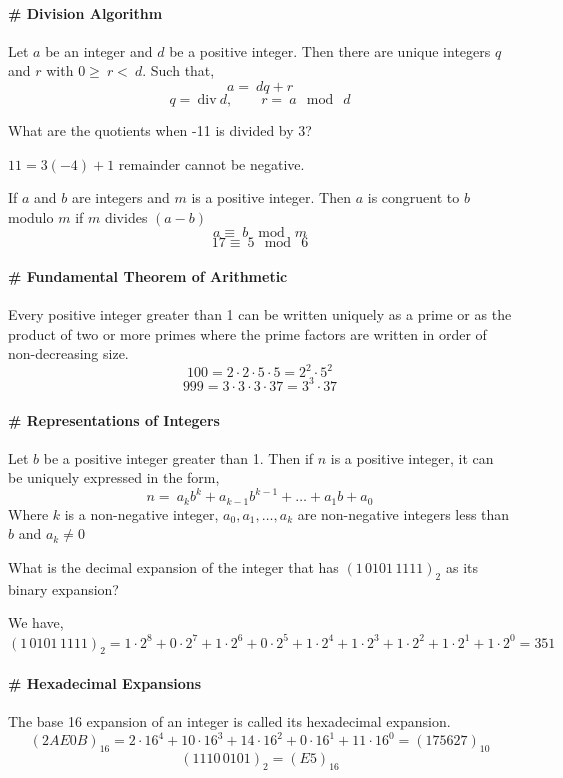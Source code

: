 \documentclass[../main-sheet.tex]{subfiles}
\begin{document}
\paragraph{\# Division Algorithm} Let $ a $ be an integer and $ d $ be a positive integer.
Then there are unique integers $ q $ and $ r $ with \(0\geq\ r <\ d\).
Such that,
\[a=\ dq+r\]
\[q=\ \text{div}\ d,\qquad r=\ a \mod \ d\]
\begin{prob}
    What are the quotients when -11 is divided by 3?
\end{prob}
\begin{soln}
    \(11=3(-4)+1\) remainder cannot be negative.
\end{soln}
If $ a $ and $ b $ are integers and $ m $ is a positive integer.
Then $ a $ is congruent to $ b $ modulo $ m $ if $ m $ divides $ (a-b) $
\[a\equiv\ b \mod\ m\]\[17\equiv\ 5 \mod\ 6\]
\paragraph{\# Fundamental Theorem of Arithmetic} Every positive integer greater than 1 can be written uniquely as a prime or as the product of two or more primes where the prime factors are written in order of non-decreasing size.
\[
    100=2\cdot2\cdot5\cdot5=2^2\cdot5^2
\]
\[
    999=3\cdot3\cdot3\cdot37=3^3 \cdot37
\]

\paragraph{\# Representations of Integers} Let $ b $ be a positive integer greater than 1. Then if $ n $ is a positive integer, it can be uniquely expressed in the form,
\[n=\ a_k b^k+a_{k-1} b^{k-1}+\dots +a_1 b+a_0\]
Where $ k $ is a non-negative integer, \(a_0,a_1,\dots,a_k\) are non-negative integers less than $ b $ and \(a_k\neq0\)
\begin{prob}
    What is the decimal expansion of the integer that has \((1\,0101\,1111)_2\) as its binary expansion?
\end{prob}
\begin{soln}
    We have,
    \[(1\,0101\,1111)_2=1\cdot 2^8+0\cdot2^7+1\cdot2^6+0\cdot2^5+1\cdot2^4+1\cdot2^3+1\cdot2^2+1\cdot2^1+1\cdot2^0=351\]
\end{soln}
\paragraph{\# Hexadecimal Expansions} The base 16 expansion of an integer is called its hexadecimal expansion.
\[(2AE0B)_{16}=2\cdot16^4+10\cdot16^3+14\cdot16^2+0\cdot16^1+11\cdot16^0=(175627)_{10}\]
\[(1110\,0101)_{2}=(E5)_{16}\]
\end{document}
